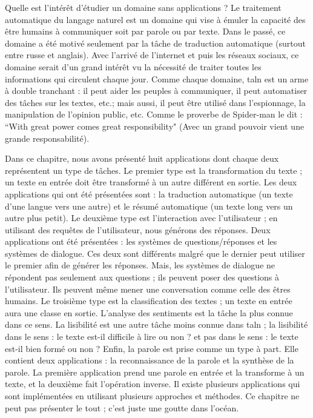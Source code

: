 \documentclass{KodeBook}
\begin{document}
\begin{discussion}
Quelle est l'intérêt d'étudier un domaine sans applications ? 
Le traitement automatique du langage naturel est un domaine qui vise à émuler la capacité des être humains à communiquer soit par parole ou par texte. 
Dans le passé, ce domaine a été motivé seulement par la tâche de traduction automatique (surtout entre russe et anglais). 
Avec l'arrivé de l'internet et puis les réseaux sociaux, ce domaine serait d'un grand intérêt vu la nécessité de traiter toutes les informations qui circulent chaque jour. 
Comme chaque domaine, \ac{taln} est un arme à double tranchant : il peut aider les peuples à communiquer, il peut automatiser des tâches sur les textes, etc.; mais aussi, il peut être utilisé dans l'espionnage, la manipulation de l'opinion public, etc. 
Comme le proverbe de Spider-man le dit : ``With great power comes great responsibility" (Avec un grand pouvoir vient une grande responsabilité). 

Dans ce chapitre, nous avons présenté huit applications dont chaque deux représentent un type de tâches. 
Le premier type est la transformation du texte ; un texte en entrée doit être transformé à un autre différent en sortie. 
Les deux applications qui ont été présentées sont : la traduction automatique (un texte d'une langue vers une autre) et le résumé automatique (un texte long vers un autre plus petit). 
Le deuxième type est l'interaction avec l'utilisateur ; en utilisant des requêtes de l'utilisateur, nous générons des réponses. 
Deux applications ont été présentées : les systèmes de questions/réponses et les systèmes de dialogue.
Ces deux sont différents malgré que le dernier peut utiliser le premier afin de générer les réponses. 
Mais, les systèmes de dialogue ne répondent pas seulement aux questions ; ils peuvent poser des questions à l'utilisateur.
Ils peuvent même mener une conversation comme celle des êtres humains. 
Le troisième type est la classification des textes ; un texte en entrée aura une classe en sortie. 
L'analyse des sentiments est la tâche la plus connue dans ce sens.
La lisibilité est une autre tâche moins connue dans \ac{taln} ; la lisibilité dans le sens : le texte est-il difficile à lire ou non ? et pas dans le sens : le texte est-il bien formé ou non ?
Enfin, la parole est prise comme un type à part. 
Elle contient deux applications : la reconnaissance de la parole et la synthèse de la parole. 
La première application prend une parole en entrée et la transforme à un texte, et la deuxième fait l'opération inverse.
Il existe plusieurs applications qui sont implémentées en utilisant plusieurs approches et méthodes. 
Ce chapitre ne peut pas présenter le tout ; c'est juste une goutte dans l'océan.
\end{discussion}

\ifx\wholebook\relax\else
% 
% 
	
\end{document}
